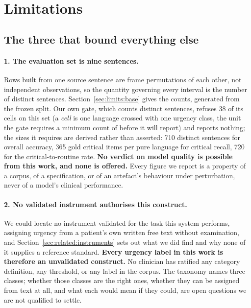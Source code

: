 %
%

\section{Limitations}
\label{sec:limitations}

\subsection{The three that bound everything else}

\paragraph{1. The evaluation set is nine sentences.} Rows built from one source
sentence are frame permutations of each other, not independent observations, so
the quantity governing every interval is the number of distinct sentences.
Section~\ref{sec:limits:base} gives the counts, generated from the frozen split.
Our own gate, which counts distinct sentences, refuses 38 of its cells on this set (a \emph{cell} is one language crossed with one urgency class, the unit the gate requires a minimum count of before it will report)
and reports nothing; the sizes it requires are derived rather than asserted:
710 distinct sentences for overall accuracy, 365 gold critical items per pure
language for critical recall, 720 for the critical-to-routine rate.
\textbf{No verdict on model quality is possible from this work, and none is
offered.} Every figure we report is a property of a corpus, of a specification, or
of an artefact's behaviour under perturbation, never of a model's clinical
performance.

\paragraph{2. No validated instrument authorises this construct.} We could
locate no instrument validated for the task this system performs, assigning
urgency from a patient's own written free text without examination, and
Section~\ref{sec:related:instruments} sets out what we did find and why none of
it supplies a reference standard. \textbf{Every urgency label in this work is
therefore an unvalidated construct.} No clinician has ratified any category definition, any threshold, or
any label in the corpus. The taxonomy names three classes; whether those classes
are the right ones, whether they can be assigned from text at all, and what each
would mean if they could, are open questions we are not qualified to settle.

